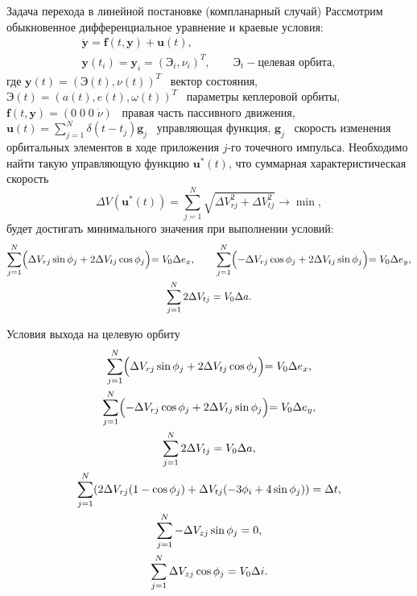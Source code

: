 \documentclass[9pt]{beamer}
\begin{document}
\begin{frame}{Задача перехода в линейной постановке (компланарный случай)}
Рассмотрим обыкновенное дифференциальное уравнение и краевые условия:
\begin{gather*}
    \dot{\mathbf{y}} = \mathbf{f}(t, \mathbf{y}) + \mathbf{u}(t), \\
    \mathbf{y}(t_i) = \mathbf{y}_i = \left( \textbf{Э}_i, \nu_i \right)^T, \quad \quad
    \textbf{Э}_t - \text{целевая орбита},
\end{gather*}
где $\mathbf{y}(t) = \left( \textbf{Э}(t), \nu(t) \right)^T$ \textemdash\ вектор состояния, $\textbf{Э}(t)=\left( a(t), e(t), \omega(t) \right)^T$ \textemdash\ параметры кеплеровой орбиты, $\mathbf{f}(t, \mathbf{y}) = (0 \; 0 \; 0 \; \dot{\nu} )$ \textemdash\ правая часть пассивного движения, $\mathbf{u}(t) = \sum_{j=1}^N \delta(t - t_j) \mathbf{g}_j$ \textemdash\ управляющая функция, $\mathbf{g}_j$ \textemdash\ скорость изменения орбитальных элементов в ходе приложения $j$-го точечного импульса. Необходимо найти такую управляющую функцию $\mathbf{u}^*(t)$, что суммарная характеристическая скорость 
\begin{equation*}
    \Delta V (\mathbf{u}^*(t)) = \sum_{j=1}^N \sqrt{\Delta V_{rj}^2 + \Delta V_{tj}^2} \to \min,
\end{equation*}
будет достигать минимального значения при выполнении условий:
\begin{gather*}
        \sum_{j=1}^{N} \Bigl( \Delta V_{rj} \sin \phi_j + 2 \Delta V_{tj} \cos \phi_j \Bigl) = V_0 \Delta e_x, \quad \quad
        \sum_{j=1}^{N} \Bigl( -\Delta V_{rj} \cos \phi_j + 2 \Delta V_{tj} \sin \phi_j \Bigl) = V_0 \Delta e_y, \\
        \sum_{j=1}^{N} 2 \Delta V_{tj} = V_0 \Delta a.
    \end{gather*}
\end{frame}

\begin{frame}{Условия выхода на целевую орбиту}
\begin{gather*}
    \sum_{j=1}^{N} \Bigl( \Delta V_{rj} \sin \phi_j + 2 \Delta V_{tj} \cos \phi_j \Bigl) = V_0 \Delta e_x, \\
    \sum_{j=1}^{N} \Bigl( -\Delta V_{rj} \cos \phi_j + 2 \Delta V_{tj} \sin \phi_j \Bigl) = V_0 \Delta e_y, \\
    \sum_{j=1}^{N} 2 \Delta V_{tj} = V_0 \Delta a, \\
    \sum_{j=1}^{N} (2 \Delta V_{rj} (1 - \cos \phi_j) + \Delta V_{tj} (-3 \phi_i + 4 \sin \phi_j)) = \Delta t, \\
    \sum_{j=1}^{N} -\Delta V_{zj} \sin \phi_j = 0, \\
    \sum_{j=1}^{N} \Delta V_{zj} \cos \phi_j = V_0 \Delta i.
\end{gather*}
\end{frame}
\end{document}
